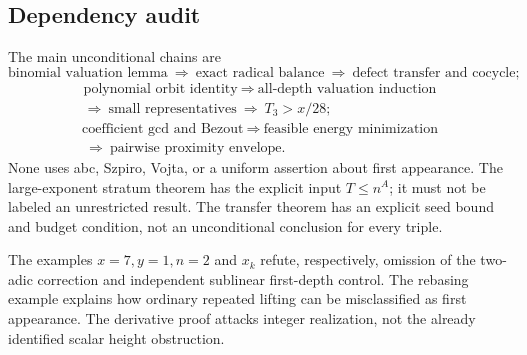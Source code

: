 \subsection{Dependency audit}
The main unconditional chains are
\[
\text{binomial valuation lemma}
\ \Longrightarrow\ \text{exact radical balance}
\ \Longrightarrow\ \text{defect transfer and cocycle};
\]
\[
\begin{gathered}
\text{polynomial orbit identity}
\ \Longrightarrow\ \text{all-depth valuation induction}\\
\Longrightarrow\ \text{small representatives}
\ \Longrightarrow\ T_3>x/28;
\end{gathered}
\]
\[
\begin{gathered}
\text{coefficient gcd and Bezout}
\ \Longrightarrow\ \text{feasible energy minimization}\\
\ \Longrightarrow\ \text{pairwise proximity envelope}.
\end{gathered}
\]
None uses abc, Szpiro, Vojta, or a uniform assertion about first appearance.
The large-exponent stratum theorem has the explicit input $T\le n^A$;
it must not be labeled an unrestricted result. The transfer theorem has an
explicit seed bound and budget condition, not an unconditional conclusion
for every triple.

The examples $x=7,y=1,n=2$ and $x_k$ refute, respectively, omission of the
two-adic correction and independent sublinear first-depth control. The
rebasing example explains how ordinary repeated lifting can be misclassified
as first appearance. The derivative proof attacks integer realization,
not the already identified scalar height obstruction.

